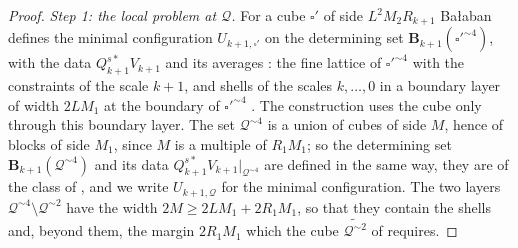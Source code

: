 \documentclass[11pt]{preprint}
\numberwithin{equation}{section}
\theoremstyle{definition}
\theoremstyle{remark}
\theoremstyle{plain}
\begin{document}
\begin{proof}
\emph{Step 1: the local problem at $\mathcal Q$.} For a cube $\square'$ of side $L^2M_2R_{k+1}$ Ba{\l}aban defines the minimal configuration $U_{k+1,\square'}$ on the determining set $\mathbf B_{k+1}(\square'^{\sim4})$, with the data $Q^{s*}_{k+1}V_{k+1}$ and its averages \cite[(2.16), p.~257; (3.4), p.~265]{BalabanCRE}: the fine lattice of $\square'^{\sim4}$ with the constraints of the scale $k + 1$, and shells of the scales $k, \dots, 0$ in a boundary layer of width $2LM_1$ at the boundary of $\square'^{\sim4}$ \cite[p.~268]{BalabanCRE}. The construction uses the cube only through this boundary layer. The set $\mathcal Q^{\sim4}$ is a union of cubes of side $M$, hence of blocks of side $M_1$, since $M$ is a multiple of $R_1M_1$; so the determining set $\mathbf B_{k+1}(\mathcal Q^{\sim4})$ and its data $Q^{s*}_{k+1}V_{k+1}|_{\mathcal Q^{\sim4}}$ are defined in the same way, they are of the class of \cite[(1)--(3), p.~277]{BalabanVAR}, and we write $U_{k+1,\mathcal Q}$ for the minimal configuration. The two layers $\mathcal Q^{\sim4} \setminus \mathcal Q^{\sim2}$ have the width $2M \geq 2LM_1 + 2R_1M_1$, so that they contain the shells and, beyond them, the margin $2R_1M_1$ which the cube $\widetilde{\mathcal Q^{\sim2}}$ of \cite[p.~279]{BalabanVAR} requires.


\end{proof}
\end{document}
